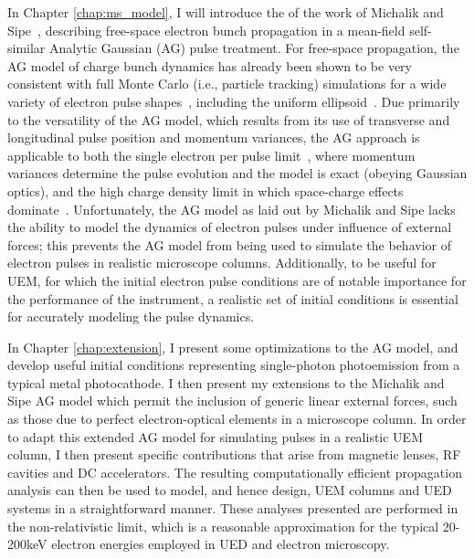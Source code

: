 In Chapter \ref{chap:ms_model}, I will introduce the of the work of Michalik and Sipe~\cite{michalik_analytic_2006,michalik_erratum:_2008}, describing free-space electron bunch propagation in a mean-field self-similar Analytic Gaussian (AG) pulse treatment.
For free-space propagation, the AG model of charge bunch dynamics has already been shown to be very consistent with full Monte Carlo (i.e., particle tracking) simulations for a wide variety of electron pulse shapes~\cite{michalik_analytic_2006,michalik_evolution_2009}, including the uniform ellipsoid~\cite{luiten_how_2004}.
Due primarily to the versatility of the AG model, which results from its use of transverse and longitudinal pulse position and momentum variances, the AG approach is applicable to both the single electron per pulse limit~\cite{lobastov_four-dimensional_2005}, where momentum variances determine the pulse evolution and the model is exact (obeying Gaussian optics), and the high charge density limit in which space-charge effects dominate~\cite{luiten_how_2004,siwick_ultrafast_2002,cao_femtosecond_2003}.
Unfortunately, the AG model as laid out by Michalik and Sipe lacks the ability to model the dynamics of electron pulses under influence of external forces; this prevents the AG model from being used to simulate the behavior of electron pulses in realistic microscope columns.
Additionally, to be useful for UEM, for which the initial electron pulse conditions are of notable importance for the performance of the instrument, a realistic set of initial conditions is essential for accurately modeling the pulse dynamics.

In Chapter \ref{chap:extension}, I present some optimizations to the AG model, and develop useful initial conditions representing single-photon photoemission from a typical metal photocathode.
I then present my extensions to the Michalik and Sipe AG model which permit the inclusion of generic linear external forces, such as those due to perfect electron-optical elements in a microscope column.
In order to adapt this extended AG model for simulating pulses in a realistic UEM column, I then present specific contributions that arise from magnetic lenses, RF cavities and DC accelerators.
The resulting computationally efficient propagation analysis can then be used to model, and hence design, UEM columns and UED systems in a straightforward manner.
These analyses presented are performed in the non-relativistic limit, which is a reasonable approximation for the typical 20-200keV electron energies employed in UED and electron microscopy.

